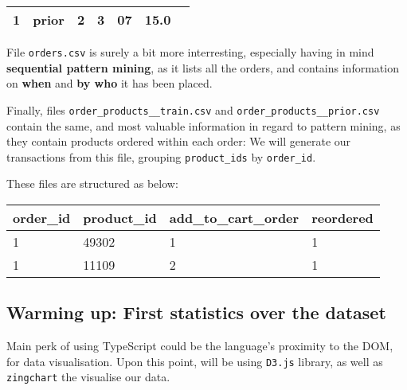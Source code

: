 \documentclass[11pt]{article}
\begin{document}
\begin{longtable}[]{@{}lllllll@{}}
\begin{minipage}[t]{0.08\columnwidth}
1\strut
\end{minipage} & \begin{minipage}[t]{0.09\columnwidth}\raggedright
prior\strut
\end{minipage} & \begin{minipage}[t]{0.12\columnwidth}\raggedright
2\strut
\end{minipage} & \begin{minipage}[t]{0.09\columnwidth}\raggedright
3\strut
\end{minipage} & \begin{minipage}[t]{0.16\columnwidth}\raggedright
07\strut
\end{minipage} & \begin{minipage}[t]{0.19\columnwidth}\raggedright
15.0\strut
\end{minipage}\tabularnewline
\bottomrule
\end{longtable}

File \texttt{orders.csv} is surely a bit more interresting, especially
having in mind \textbf{sequential pattern mining}, as it lists all the
orders, and contains information on \textbf{when} and \textbf{by who} it
has been placed.

Finally, files \texttt{order\_products\_\_train.csv} and
\texttt{order\_products\_\_prior.csv} contain the same, and most
valuable information in regard to pattern mining, as they contain
products ordered within each order: We will generate our transactions
from this file, grouping \texttt{product\_ids} by \texttt{order\_id}.

These files are structured as below:

\begin{longtable}[]{@{}llll@{}}
\toprule
order\_id & product\_id & add\_to\_cart\_order &
reordered\tabularnewline
\midrule
\endhead
1 & 49302 & 1 & 1\tabularnewline
1 & 11109 & 2 & 1\tabularnewline
\bottomrule
\end{longtable}

    \hypertarget{warming-up-first-statistics-over-the-dataset}{%
\subsection{Warming up: First statistics over the
dataset}\label{warming-up-first-statistics-over-the-dataset}}

Main perk of using TypeScript could be the language's proximity to the
DOM, for data visualisation. Upon this point, will be using
\texttt{D3.js} library, as well as \texttt{zingchart} the visualise our
data.
\end{document}
